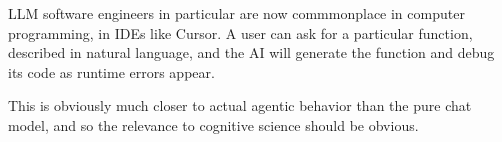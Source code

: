 LLM software engineers in particular are now commmonplace in computer
programming, in IDEs like Cursor. A user can ask for a particular function,
described in natural language, and the AI will generate the function and debug
its code as runtime errors appear.

This is obviously much closer to actual agentic behavior than the pure chat
model, and so the relevance to cognitive science should be obvious.



